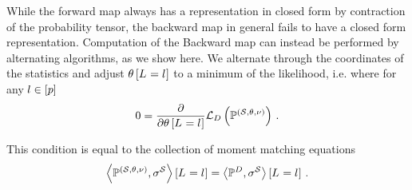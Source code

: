 \label{sec:alternatingBackwardMap}

While the forward map always has a representation in closed form by contraction of the probability tensor, the backward map in general fails to have a closed form representation.
Computation of the Backward map can instead be performed by alternating algorithms, as we show here. %
We alternate through the coordinates of the statistics and adjust $\theta\left[L_{}=l_{}\right]$ to a minimum of the likelihood, i.e. where for any $l\in[p]$
\begin{align*}
    0 = \frac{\partial}{\partial \theta\left[L_{}=l_{}\right]} \mathcal{L}_{D}\left(\mathbb{P}^{(\mathcal{S},\theta,\nu)}\right) \, .
\end{align*}

This condition is equal to the collection of moment matching equations %
\begin{align*}
    \left\langle \mathbb{P}^{(\mathcal{S},\theta,\nu)},\sigma^{\mathcal{S}}\right\rangle \left[ L_{}=l_{} \right] = \left\langle \mathbb{P}^{D},\sigma^{\mathcal{S}}\right\rangle \left[ L_{}=l_{} \right] \, .
\end{align*}


